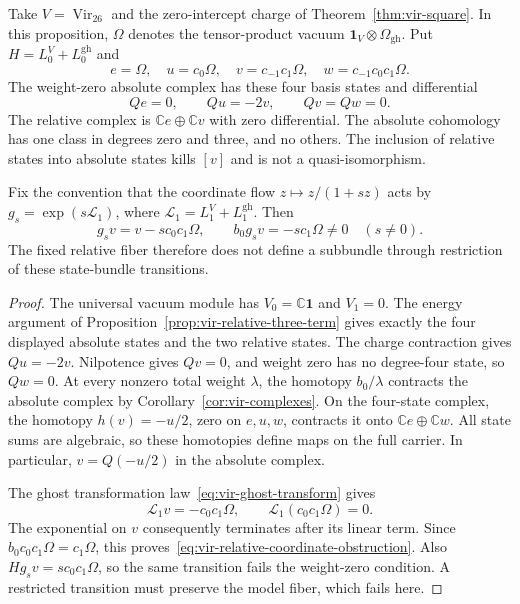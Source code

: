 \begin{proposition}
\label{prop:vir-relative-target-obstruction}
Take $V=\operatorname{Vir}_{26}$ and the zero-intercept charge of Theorem~\ref{thm:vir-square}.
In this proposition, $\Omega$ denotes the tensor-product vacuum $\mathbf1_V\otimes\Omega_{\mathrm{gh}}$.
Put $H=L_0^V+L_0^{\mathrm{gh}}$ and
\[
 e=\Omega,\quad u=c_0\Omega,\quad
 v=c_{-1}c_1\Omega,\quad w=c_{-1}c_0c_1\Omega.
\]
The weight-zero absolute complex has these four basis states and differential
\[
 Qe=0,\qquad Qu=-2v,\qquad Qv=Qw=0.
\]
The relative complex is $\mathbb Ce\oplus\mathbb Cv$ with zero differential.
The absolute cohomology has one class in degrees zero and three, and no others.
The inclusion of relative states into absolute states kills $[v]$ and is not a quasi-isomorphism.

Fix the convention that the coordinate flow $z\mapsto z/(1+sz)$ acts by
$g_s=\exp(s\mathcal L_1)$, where $\mathcal L_1=L_1^V+L_1^{\mathrm{gh}}$.
Then
\begin{equation}\label{eq:vir-relative-coordinate-obstruction}
 g_sv=v-sc_0c_1\Omega,
 \qquad b_0g_sv=-sc_1\Omega\neq0\quad(s\neq0).
\end{equation}
The fixed relative fiber therefore does not define a subbundle through restriction of these state-bundle transitions.
\end{proposition}

\begin{proof}
The universal vacuum module has $V_0=\mathbb C\mathbf1$ and $V_1=0$.
The energy argument of Proposition~\ref{prop:vir-relative-three-term} gives exactly the four displayed absolute states and the two relative states.
The charge contraction gives $Qu=-2v$.
Nilpotence gives $Qv=0$, and weight zero has no degree-four state, so $Qw=0$.
At every nonzero total weight $\lambda$, the homotopy $b_0/\lambda$ contracts the absolute complex by Corollary~\ref{cor:vir-complexes}.
On the four-state complex, the homotopy $h(v)=-u/2$, zero on $e,u,w$, contracts it onto $\mathbb Ce\oplus\mathbb Cw$.
All state sums are algebraic, so these homotopies define maps on the full carrier.
In particular, $v=Q(-u/2)$ in the absolute complex.

The ghost transformation law~\eqref{eq:vir-ghost-transform} gives
\[
 \mathcal L_1v=-c_0c_1\Omega,
 \qquad \mathcal L_1(c_0c_1\Omega)=0.
\]
The exponential on $v$ consequently terminates after its linear term.
Since $b_0c_0c_1\Omega=c_1\Omega$, this proves~\eqref{eq:vir-relative-coordinate-obstruction}.
Also $Hg_sv=sc_0c_1\Omega$, so the same transition fails the weight-zero condition.
A restricted transition must preserve the model fiber, which fails here.
\end{proof}

